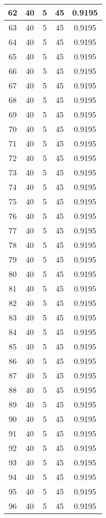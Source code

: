 \documentclass[letterpaper, 12pt]{article}
\begin{document}
\begin{longtable}{|c|c|c|c|c|}
\hline
62 & 40 & 5 & 45 & 0.9195 \\
\hline
63 & 40 & 5 & 45 & 0.9195 \\
\hline
64 & 40 & 5 & 45 & 0.9195 \\
\hline
65 & 40 & 5 & 45 & 0.9195 \\
\hline
66 & 40 & 5 & 45 & 0.9195 \\
\hline
67 & 40 & 5 & 45 & 0.9195 \\
\hline
68 & 40 & 5 & 45 & 0.9195 \\
\hline
69 & 40 & 5 & 45 & 0.9195 \\
\hline
70 & 40 & 5 & 45 & 0.9195 \\
\hline
71 & 40 & 5 & 45 & 0.9195 \\
\hline
72 & 40 & 5 & 45 & 0.9195 \\
\hline
73 & 40 & 5 & 45 & 0.9195 \\
\hline
74 & 40 & 5 & 45 & 0.9195 \\
\hline
75 & 40 & 5 & 45 & 0.9195 \\
\hline
76 & 40 & 5 & 45 & 0.9195 \\
\hline
77 & 40 & 5 & 45 & 0.9195 \\
\hline
78 & 40 & 5 & 45 & 0.9195 \\
\hline
79 & 40 & 5 & 45 & 0.9195 \\
\hline
80 & 40 & 5 & 45 & 0.9195 \\
\hline
81 & 40 & 5 & 45 & 0.9195 \\
\hline
82 & 40 & 5 & 45 & 0.9195 \\
\hline
83 & 40 & 5 & 45 & 0.9195 \\
\hline
84 & 40 & 5 & 45 & 0.9195 \\
\hline
85 & 40 & 5 & 45 & 0.9195 \\
\hline
86 & 40 & 5 & 45 & 0.9195 \\
\hline
87 & 40 & 5 & 45 & 0.9195 \\
\hline
88 & 40 & 5 & 45 & 0.9195 \\
\hline
89 & 40 & 5 & 45 & 0.9195 \\
\hline
90 & 40 & 5 & 45 & 0.9195 \\
\hline
91 & 40 & 5 & 45 & 0.9195 \\
\hline
92 & 40 & 5 & 45 & 0.9195 \\
\hline
93 & 40 & 5 & 45 & 0.9195 \\
\hline
94 & 40 & 5 & 45 & 0.9195 \\
\hline
95 & 40 & 5 & 45 & 0.9195 \\
\hline
96 & 40 & 5 & 45 & 0.9195 \\

\end{longtable}
\end{document}
